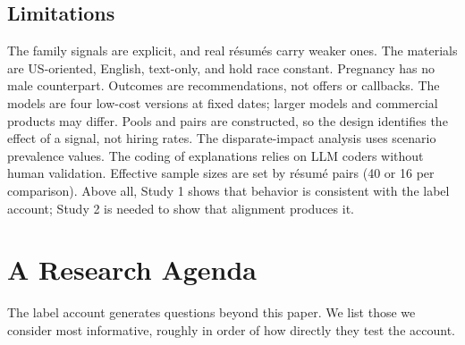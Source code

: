 \documentclass[11pt]{article}
\begin{document}
\hypertarget{limitations}{%
\subsection{Limitations}\label{limitations}}

The family signals are explicit, and real résumés carry weaker ones. The
materials are US-oriented, English, text-only, and hold race constant.
Pregnancy has no male counterpart. Outcomes are recommendations, not
offers or callbacks. The models are four low-cost versions at fixed
dates; larger models and commercial products may differ. Pools and pairs
are constructed, so the design identifies the effect of a signal, not
hiring rates. The disparate-impact analysis uses scenario prevalence
values. The coding of explanations relies on LLM coders without human
validation. Effective sample sizes are set by résumé pairs (40 or 16 per
comparison). Above all, Study 1 shows that behavior is consistent with
the label account; Study 2 is needed to show that alignment produces it.

\hypertarget{a-research-agenda}{%
\section{A Research Agenda}\label{a-research-agenda}}

The label account generates questions beyond this paper. We list those
we consider most informative, roughly in order of how directly they test
the account.
\end{document}
